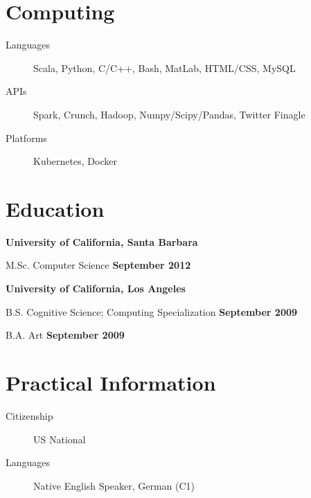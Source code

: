 \documentclass[margin,line]{res}
\newenvironment{list1}{
  \begin{list}{\ding{113}}{%
      \setlength{\itemsep}{0in}
      \setlength{\parsep}{0in} \setlength{\parskip}{0in}
      \setlength{\topsep}{0in} \setlength{\partopsep}{0in}
      \setlength{\leftmargin}{0.17in}}}{\end{list}}
\begin{document}
\begin{resume}
\section{\sc Computing}
\begin{description}
\item[Languages] Scala, Python, C/C++, Bash, MatLab, HTML/CSS, MySQL
\item[APIs] Spark, Crunch, Hadoop, Numpy/Scipy/Pandas, Twitter Finagle
\item[Platforms] Kubernetes, Docker
\end{description}

\section{\sc Education}
{\bf University of California, Santa Barbara}\\
\vspace*{-.1in}
\begin{list1}
\item[] M.Sc. Computer Science \hfill {\bf September 2012}
\end{list1}

{\bf University of California, Los Angeles}\\
\vspace*{-.1in}
\begin{list1}
\item[] B.S. Cognitive Science; Computing Specialization \hfill {\bf September 2009}
\item[] B.A. Art \hfill {\bf September 2009}
\end{list1}

\section{\sc Practical Information}
\begin{description}
\item[Citizenship] US National
\item[Languages] Native English Speaker, German (C1)
\end{description}





\end{resume}
\end{document}
